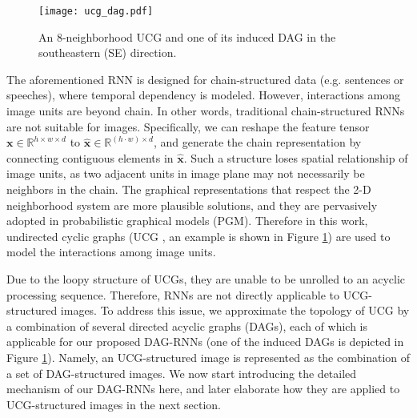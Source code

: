 \documentclass[10pt,twocolumn,letterpaper]{article}
\newcommand \xx {\mathbf{x}}
\begin{document}
\label{Section:quaddirectionality}
\begin{figure}[t]
\centering
\texttt{[image: ucg\_dag.pdf]}
\caption{An 8-neighborhood UCG and one of its induced DAG in the southeastern (SE) direction.}
\label{Figure:ucg_dag}
\end{figure}

The aforementioned RNN is designed for chain-structured data (e.g. sentences or speeches), where temporal dependency is modeled. However, interactions among image units are beyond chain. In other words, traditional chain-structured RNNs are not suitable for images. Specifically, we can reshape the feature tensor $\xx \in \mathbb{R}^{h \times w \times d}$ to $\hat{\xx} \in \mathbb{R}^{(h\cdot w) \times d}$, and generate the chain representation by connecting contiguous elements in $\hat{\xx}$. Such a structure loses spatial relationship of image units, as two adjacent units in image plane may not necessarily be neighbors in the chain. The graphical representations that respect the 2-D neighborhood system are more plausible solutions, and they are pervasively adopted in probabilistic graphical models (PGM). Therefore in this work, undirected cyclic graphs (UCG , an example is shown in Figure \ref{Figure:ucg_dag}) are used to model the interactions among image units.





Due to the loopy structure of UCGs, they are unable to be unrolled to an acyclic processing sequence. Therefore, RNNs are not directly applicable to UCG-structured images.
To address this issue, we approximate the topology of UCG by a combination of several directed acyclic graphs (DAGs), each of which is applicable for our proposed DAG-RNNs (one of the induced DAGs is depicted in Figure \ref{Figure:ucg_dag}). Namely, an UCG-structured image is represented as the combination of a set of DAG-structured images.  We now start introducing the detailed mechanism of our DAG-RNNs here, and later elaborate how they are applied to UCG-structured images in the next section.
\end{document}
